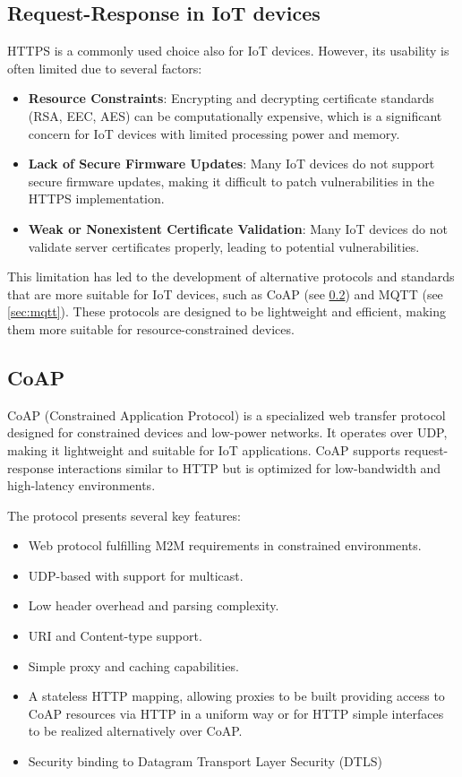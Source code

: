 \subsection{Request-Response in IoT devices}
HTTPS is a commonly used choice also for IoT devices. However, its usability is often limited due to several factors:
\begin{itemize}
    \item \textbf{Resource Constraints\cite{mazhar2023iotsecurity}}: Encrypting and decrypting certificate standards (RSA, EEC, AES) can be computationally expensive, which is a significant concern for IoT devices with limited processing power and memory.
    \item \textbf{Lack of Secure Firmware Updates\cite{Bettayeb2019tw}}: Many IoT devices do not support secure firmware updates, making it difficult to patch vulnerabilities in the HTTPS implementation.
    \item \textbf{Weak or Nonexistent Certificate Validation\cite{paracha2021iotls}}: Many IoT devices do not validate server certificates properly, leading to potential vulnerabilities.
\end{itemize}

This limitation has led to the development of alternative protocols and standards that are more suitable for IoT devices, such as CoAP (see \cref{sec:coap}) and MQTT (see \cref{sec:mqtt}). These protocols are designed to be lightweight and efficient, making them more suitable for resource-constrained devices.

\subsection{CoAP} \label{sec:coap}

CoAP (Constrained Application Protocol) is a specialized web transfer protocol designed for constrained devices and low-power networks\cite{rfc7252}. It operates over UDP, making it lightweight and suitable for IoT applications. CoAP supports request-response interactions similar to HTTP but is optimized for low-bandwidth and high-latency environments.

The protocol presents several key features:
\begin{itemize}
    \item Web protocol fulfilling M2M requirements in constrained
      environments.
    \item UDP-based with support for multicast.
    \item Low header overhead and parsing complexity.
    \item URI and Content-type support.
    \item Simple proxy and caching capabilities.
    \item A stateless HTTP mapping, allowing proxies to be built providing access to CoAP resources via HTTP in a uniform way or for HTTP simple interfaces to be realized alternatively over CoAP.
    \item Security binding to Datagram Transport Layer Security (DTLS)
\end{itemize}

